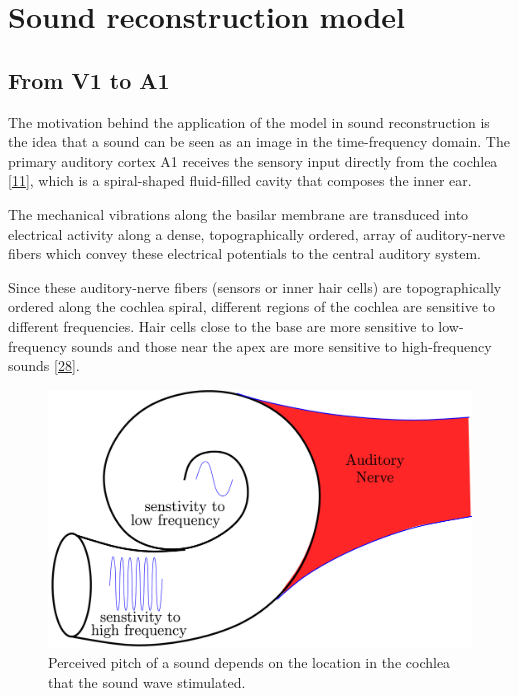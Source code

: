 \documentclass[american,]{article}
\theoremstyle{definition}
\theoremstyle{definition}
\theoremstyle{definition}
\theoremstyle{remark}
\begin{document}
\pagebreak

\hypertarget{sound-reconstruction-model}{%
\section{Sound reconstruction model}\label{sound-reconstruction-model}}

\hypertarget{from-v1-to-a1}{%
\subsection{From V1 to A1}\label{from-v1-to-a1}}

The motivation behind the application of the model in sound reconstruction
is the idea that a sound can be seen as an image in the time-frequency domain.
The primary auditory cortex A1 receives the sensory input directly from the cochlea {[}\protect\hyperlink{ref-dallos1996}{11}{]},
which is a spiral-shaped fluid-filled cavity that composes the inner ear.

The mechanical vibrations along the basilar membrane are transduced into electrical activity
along a dense, topographically ordered, array of auditory-nerve fibers
which convey these electrical potentials to the central auditory system.

Since these auditory-nerve fibers (sensors or inner hair cells) are topographically ordered
along the cochlea spiral, different regions of the cochlea are sensitive to different frequencies.
Hair cells close to the base are more sensitive to low-frequency sounds and those near the apex
are more sensitive to high-frequency sounds {[}\protect\hyperlink{ref-yang1992}{28}{]}.

\begin{figure}[H]

{\centering \includegraphics[width=0.5\linewidth]{img/cochlea} 

}

\caption{Perceived pitch of a sound depends on the location in the cochlea that the sound wave stimulated.}\label{fig:cochlea}
\end{figure}
\end{document}
